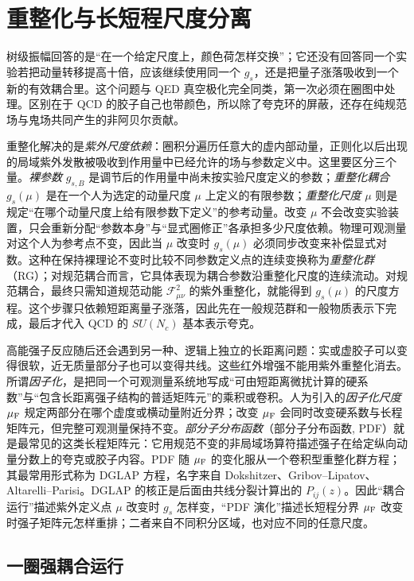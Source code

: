 \section{重整化与长短程尺度分离}\label{sec:qcd-running-ir-dp10}

树级振幅回答的是“在一个给定尺度上，颜色荷怎样交换”；它还没有回答同一个实验若把动量转移提高十倍，应该继续使用同一个 $g_s$，还是把量子涨落吸收到一个新的有效耦合里。这个问题与 QED 真空极化完全同类，第一次必须在圈图中处理。区别在于 QCD 的胶子自己也带颜色，所以除了夸克环的屏蔽，还存在纯规范场与鬼场共同产生的非阿贝尔贡献。

重整化解决的是\emph{紫外尺度依赖}：圈积分遍历任意大的虚内部动量，正则化以后出现的局域紫外发散被吸收到作用量中已经允许的场与参数定义中。这里要区分三个量。\emph{裸参数} $g_{s,B}$ 是调节后的作用量中尚未按实验尺度定义的参数；\emph{重整化耦合} $g_s(\mu)$ 是在一个人为选定的动量尺度 $\mu$ 上定义的有限参数；\emph{重整化尺度} $\mu$ 则是规定“在哪个动量尺度上给有限参数下定义”的参考动量。改变 $\mu$ 不会改变实验装置，只会重新分配“参数本身”与“显式圈修正”各承担多少尺度依赖。物理可观测量对这个人为参考点不变，因此当 $\mu$ 改变时 $g_s(\mu)$ 必须同步改变来补偿显式对数。这种在保持裸理论不变时比较不同参数定义点的连续变换称为\emph{重整化群}（RG）；对规范耦合而言，它具体表现为耦合参数沿重整化尺度的连续流动。对规范耦合，最终只需知道规范动能 $\mathcal F_{\mu\nu}^2$ 的紫外重整化，就能得到 $g_s(\mu)$ 的尺度方程。这个步骤只依赖短距离量子涨落，因此先在一般规范群和一般物质表示下完成，最后才代入 QCD 的 $SU(N_c)$ 基本表示夸克。

高能强子反应随后还会遇到另一种、逻辑上独立的长距离问题：实或虚胶子可以变得很软，近无质量部分子也可以变得共线。这些红外增强不能用紫外重整化消去。所谓\emph{因子化}，是把同一个可观测量系统地写成“可由短距离微扰计算的硬系数”与“包含长距离强子结构的普适矩阵元”的乘积或卷积。人为引入的\emph{因子化尺度} $\mu_{\rm F}$ 规定两部分在哪个虚度或横动量附近分界；改变 $\mu_{\rm F}$ 会同时改变硬系数与长程矩阵元，但完整可观测量保持不变。\emph{部分子分布函数}（部分子分布函数, PDF）就是最常见的这类长程矩阵元：它用规范不变的非局域场算符描述强子在给定纵向动量分数上的夸克或胶子内容。PDF 随 $\mu_{\rm F}$ 的变化服从一个卷积型重整化群方程；其最常用形式称为 DGLAP 方程，名字来自 Dokshitzer、Gribov--Lipatov、Altarelli--Parisi。DGLAP 的核正是后面由共线分裂计算出的 $P_{ij}(z)$。因此“耦合运行”描述紫外定义点 $\mu$ 改变时 $g_s$ 怎样变，“PDF 演化”描述长短程分界 $\mu_{\rm F}$ 改变时强子矩阵元怎样重排；二者来自不同积分区域，也对应不同的任意尺度。

\subsection{一圈强耦合运行}

